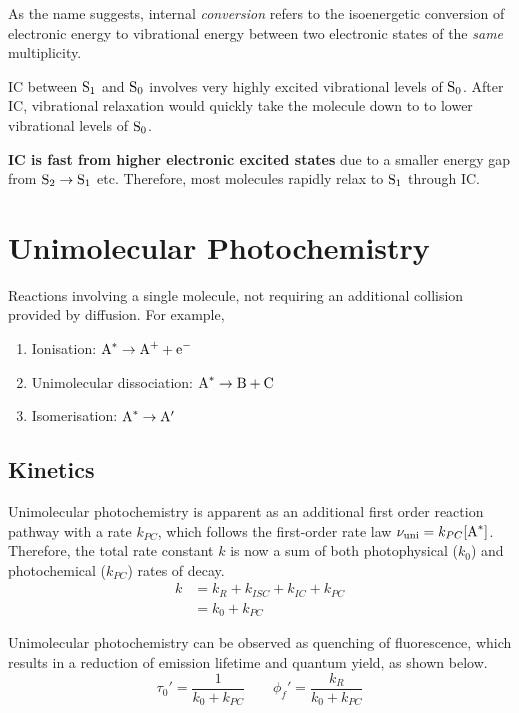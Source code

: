 \documentclass[a4paper]{tufte-handout}
\theoremstyle{definition}
\begin{document}
As the name suggests, internal \textit{conversion} refers to the isoenergetic conversion of electronic energy to vibrational energy
between two electronic states of the \textit{same} multiplicity.

IC between $\ce{S1}$ and $\ce{S0}$ involves very highly excited vibrational levels of $\ce{S0}$. After IC, vibrational relaxation would
quickly take the molecule down to to lower vibrational levels of $\ce{S0}$.

\textbf{IC is fast from higher electronic excited states} due to a smaller energy gap from $\ce{S2} \rightarrow \ce{S1}$ etc. Therefore, most
molecules rapidly relax to $\ce{S1}$ through IC. 

\section{Unimolecular Photochemistry}

Reactions involving a single molecule, not requiring an additional collision provided by diffusion. For example,

\begin{enumerate}
  \item Ionisation: $\ce{A^*} \rightarrow \ce{A+} + \ce{e-}$
  \item Unimolecular dissociation: $\ce{A^{*}} \rightarrow \ce{B} + \ce{C}$
  \item Isomerisation: $\ce{A^*} \rightarrow \ce{A}'$
\end{enumerate}

\subsection*{Kinetics}
Unimolecular photochemistry is apparent as an additional first order reaction pathway with a rate $k_{PC}$, which follows
the first-order rate law $\nu_{\mathrm{uni}} = k_{PC}[\ce{A^*}]$. Therefore, the total rate constant $k$ is now a
sum of both photophysical ($k_0$) and photochemical ($k_{PC}$) rates of decay.
\begin{align*}
  k &= k_R + k_{ISC} + k_{IC} +k_{PC} \\
    &= k_0 + k_{PC}
\end{align*}

Unimolecular photochemistry can be observed as quenching of fluorescence, which results in a reduction of emission lifetime and quantum yield,
as shown below.
\begin{equation}
  \tau_0' = \frac{1}{k_0 + k_{PC}} \qquad \phi_f' = \frac{k_R}{k_0 + k_{PC}}
\end{equation}
\end{document}
